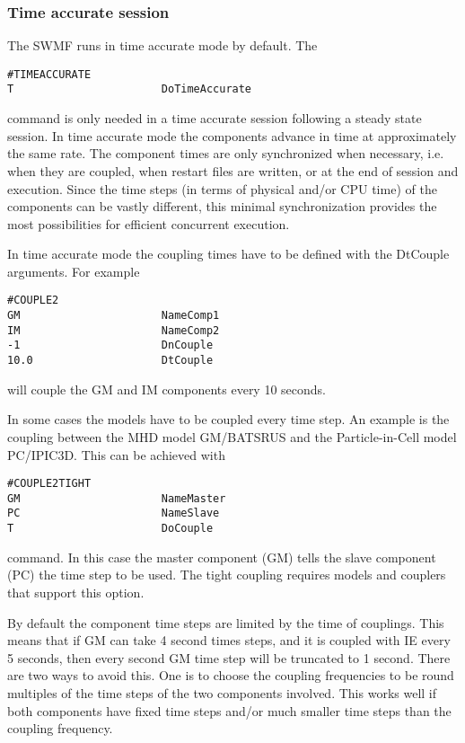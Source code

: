 \subsubsection{Time accurate session}

The SWMF runs in time accurate mode by default. The
\begin{verbatim}
#TIMEACCURATE
T                       DoTimeAccurate
\end{verbatim}
command is only needed in a time accurate session following a 
steady state session.
In time accurate mode the components advance in time at
approximately the same rate. The component times are
only synchronized when necessary, i.e. when they
are coupled, when restart files are written, or 
at the end of session and execution. Since the time
steps (in terms of physical and/or CPU time) of the components can be 
vastly different, this minimal synchronization provides the 
most possibilities for efficient concurrent execution.

In time accurate mode the coupling times have to be defined
with the DtCouple arguments. For example
\begin{verbatim}
#COUPLE2
GM                      NameComp1
IM                      NameComp2
-1                      DnCouple
10.0                    DtCouple
\end{verbatim}
will couple the GM and IM components every 10 seconds. 

In some cases the models have to be coupled every time step.
An example is the coupling between the MHD model GM/BATSRUS and 
the Particle-in-Cell model PC/IPIC3D. This can be achieved with
\begin{verbatim}
#COUPLE2TIGHT
GM                      NameMaster
PC                      NameSlave
T                       DoCouple
\end{verbatim}
command. In this case the master component (GM) tells the slave
component (PC) the time step to be used. The tight 
coupling requires models and couplers that support this option.

By default the component time steps are limited by the
time of couplings. This means that if GM can take 4 second
times steps, and it is coupled with IE every 5 seconds,
then every second GM time step will be truncated to 1 second.
There are two ways to avoid this. One is to choose the
coupling frequencies to be round multiples of the time steps
of the two components involved. This works well if both components
have fixed time steps and/or much smaller time steps than the 
coupling frequency.

